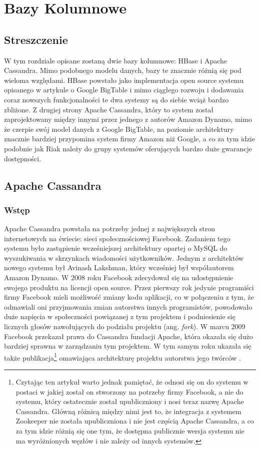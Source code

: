 \chapter{Bazy Kolumnowe}

\section*{Streszczenie}
W tym rozdziale opisane zostaną dwie bazy kolumnowe: HBase i Apache Cassandra.
Mimo podobnego modelu danych, bazy te znacznie różnią się pod wieloma względami.
HBase powstało jako implementacja open source systemu opisanego w artykule o Google BigTable i mimo ciągłego rozwoju i dodawania coraz nowszych funkcjonalności te dwa systemy są do siebie wciąż bardzo zbliżone.
Z drugiej strony Apache Cassandra, który to system został zaprojektowany między innymi przez jednego z autorów Amazon Dynamo, mimo że czerpie swój model danych z Google BigTable, na poziomie architektury znacznie bardziej przypomina system firmy Amazon niż Google, a co za tym idzie podobnie jak Riak należy do grupy systemów oferujących bardzo duże gwarancje dostępności.

\section{Apache Cassandra}
\label{sec:cassandra}

\subsection*{Wstęp}

Apache Cassandra powstała na potrzeby jednej z największych stron internetowych na świecie: sieci społecznościowej Facebook. 
Zadaniem tego systemu było zastąpienie wcześniejszej architektury opartej o MySQL do wyszukiwania w skrzynkach wiadomości użytkowników.
Jednym z architektów nowego systemu był Avinash Lakshman, który wcześniej był współautorem Amazon Dynamo.
W 2008 roku Facebook zdecydował się na udostępnienie swojego produktu na licencji open source.
Przez pierwszy rok jedynie programiści firmy Facebook mieli możliwość zmiany kodu aplikacji, co w połączeniu z tym, że odmawiali oni przyjmowania zmian autorstwa innych programistów, powodowało duże napięcia w społeczności powiązanej z tym projektem i podniesienie się licznych głosów nawołujących do podziału projektu (ang. \emph{fork}).
W marcu 2009 Facebook przekazał prawa do Cassandra fundacji Apache, która okazała się dużo bardziej sprawna w zarządzaniu tym projektem\cite{evans-cassandra}.
W tym samym roku ukazała się także publikacja\footnote{Czytając ten artykuł warto jednak pamiętać, że odnosi się on do systemu w postaci w jakiej został on stworzony na potrzeby firmy Facebook, a nie do systemu, który ostatecznie został upubliczniony i nosi teraz nazwę Apache Cassandra. Główną różnicą między nimi jest to, że integracja z systemem Zookeeper nie została upubliczniona i nie jest częścią Apache Cassandra, a co za tym idzie różnią się one tym, że dostępna publicznie wersja systemu nie ma wyróżnionych węzłów i nie zależy od innych systemów.} omawiająca architekturę projektu autorstwa jego twórców \cite{cassandra-paper}.

